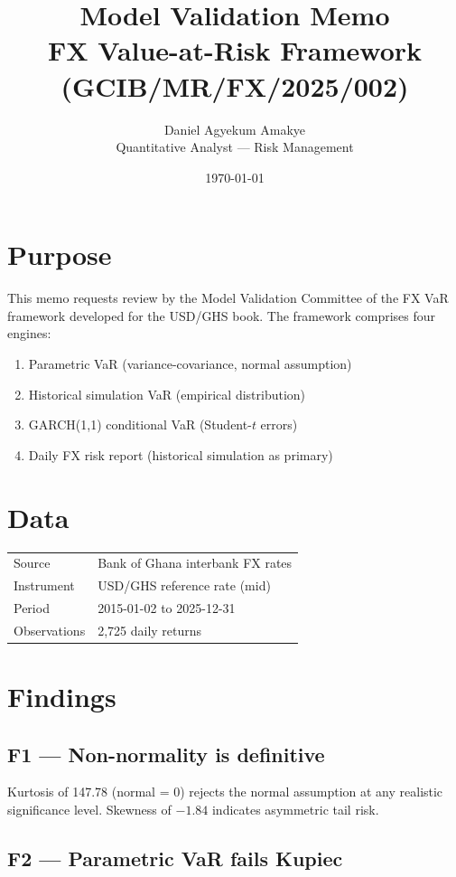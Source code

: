 \documentclass[11pt,a4paper]{article}
\title{\vspace{-1.5cm}\textbf{Model Validation Memo}\\[0.3em]
\large FX Value-at-Risk Framework (GCIB/MR/FX/2025/002)}
\author{Daniel Agyekum Amakye \\ \small Quantitative Analyst --- Risk Management}
\date{\today}
\begin{document}
\maketitle

\section*{Purpose}

This memo requests review by the Model Validation Committee of the
FX VaR framework developed for the USD/GHS book. The framework comprises
four engines:

\begin{enumerate}
  \item Parametric VaR (variance-covariance, normal assumption)
  \item Historical simulation VaR (empirical distribution)
  \item GARCH(1,1) conditional VaR (Student-$t$ errors)
  \item Daily FX risk report (historical simulation as primary)
\end{enumerate}

\section*{Data}

\begin{tabularx}{\textwidth}{@{}lX@{}}
\toprule
Source & Bank of Ghana interbank FX rates \\
Instrument & USD/GHS reference rate (mid) \\
Period & 2015-01-02 to 2025-12-31 \\
Observations & 2{,}725 daily returns \\
\bottomrule
\end{tabularx}

\section*{Findings}

\subsection*{F1 --- Non-normality is definitive}

Kurtosis of 147.78 (normal = 0) rejects the normal assumption at any
realistic significance level. Skewness of $-1.84$ indicates asymmetric
tail risk.

\subsection*{F2 --- Parametric VaR fails Kupiec}
\end{document}
